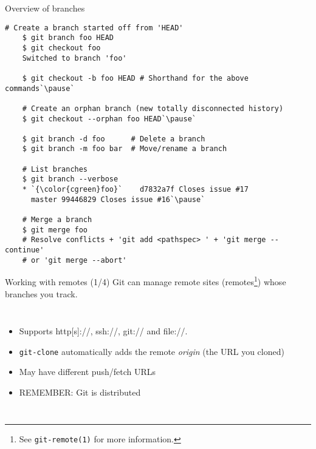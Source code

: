 \begin{frame}[fragile]{Overview of branches}
  \begin{lstlisting}[style=bash]
    # Create a branch started off from 'HEAD'
    $ git branch foo HEAD
    $ git checkout foo
    Switched to branch 'foo'

    $ git checkout -b foo HEAD # Shorthand for the above commands`\pause`

    # Create an orphan branch (new totally disconnected history)
    $ git checkout --orphan foo HEAD`\pause`

    $ git branch -d foo      # Delete a branch
    $ git branch -m foo bar  # Move/rename a branch

    # List branches
    $ git branch --verbose
    * `{\color{cgreen}foo}`    d7832a7f Closes issue #17
      master 99446829 Closes issue #16`\pause`

    # Merge a branch
    $ git merge foo
    # Resolve conflicts + 'git add <pathspec> ' + 'git merge --continue'
    # or 'git merge --abort'
  \end{lstlisting}
\end{frame}

\begin{frame}{Working with remotes (1/4)}
  Git can manage remote sites (remotes\footnote{See \texttt{git-remote(1)} for more information.}) whose branches you track.
  \begin{columns}
    \begin{itemize}
    \item Supports http[s]://, ssh://, git:// and file://.
    \item \texttt{git-clone} automatically adds the remote \emph{origin} (the URL you cloned)
    \item May have different push/fetch URLs
    \item<2> \alert{REMEMBER:} Git is distributed
    \end{itemize}

    \centering
  \end{columns}
\end{frame}


